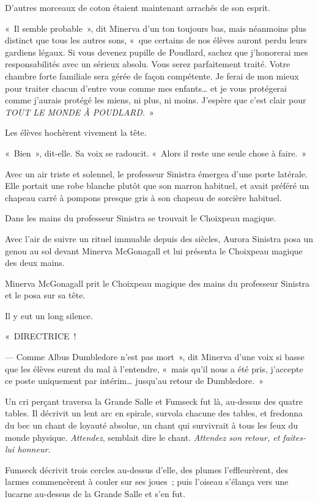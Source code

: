 D'autres morceaux de coton étaient maintenant arrachés de son esprit.

«~Il semble probable~», dit Minerva d'un ton toujours bas, mais néanmoins plus distinct que tous les autres sons, «~que certains de nos élèves auront perdu leurs gardiens légaux.
Si vous devenez pupille de Poudlard, sachez que j'honorerai mes responsabilités avec un sérieux absolu.
Vous serez parfaitement traité.
Votre chambre forte familiale sera gérée de façon compétente.
Je ferai de mon mieux pour traiter chacun d'entre vous comme mes enfants… et je vous protégerai comme j'aurais protégé les miens, ni plus, ni moins.
J'espère que c'est clair pour \emph{TOUT LE MONDE À POUDLARD.}~»

Les élèves hochèrent vivement la tête.

«~Bien~», dit-elle.
Sa voix se radoucit.
«~Alors il reste une seule chose à faire.~»

Avec un air triste et solennel, le professeur Sinistra émergea d'une porte latérale.
Elle portait une robe blanche plutôt que son marron habituel, et avait préféré un chapeau carré à pompons presque gris à son chapeau de sorcière habituel.

Dans les mains du professeur Sinistra se trouvait le Choixpeau magique.

Avec l'air de suivre un rituel immuable depuis des siècles, Aurora Sinistra posa un genou au sol devant Minerva McGonagall et lui présenta le Choixpeau magique des deux mains.

Minerva McGonagall prit le Choixpeau magique des mains du professeur Sinistra et le posa sur sa tête.

Il y eut un long silence.

«~DIRECTRICE~!

--- Comme Albus Dumbledore n'est pas mort~», dit Minerva d'une voix si basse que les élèves eurent du mal à l'entendre, «~mais qu'il nous a été pris, j'accepte ce poste uniquement par intérim… jusqu'au retour de Dumbledore.~»

Un cri perçant traversa la Grande Salle et Fumseck fut là, au-dessus des quatre tables.
Il décrivit un lent arc en spirale, survola chacune des tables, et fredonna du bec un chant de loyauté absolue, un chant qui survivrait à tous les feux du monde physique.
\emph{Attendez}, semblait dire le chant.
\emph{Attendez son retour, et faites-lui honneur.}

Fumseck décrivit trois cercles au-dessus d'elle, des plumes l'effleurèrent, des larmes commencèrent à couler sur ses joues~; puis l'oiseau s'élança vers une lucarne au-dessus de la Grande Salle et s'en fut.
